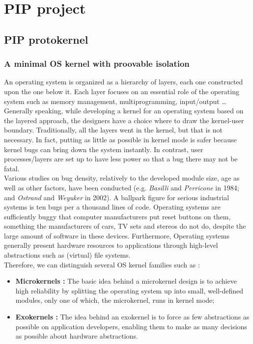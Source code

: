 \chapter{PIP project}

\section{PIP protokernel}

\subsection{A minimal OS kernel with proovable isolation} \label{PIP}
An operating system is organized as a hierarchy  of layers, each one constructed  upon  the one  below  it. Each layer focuses on an essential role of the operating system such as memory management, multiprogramming, input/output \dots Generally speaking, while developing a kernel for an operating system based on the layered  approach,  the designers have a choice where to draw the kernel-user boundary. Traditionally, all the layers went in the kernel, but that is not necessary. In fact, putting as little as possible in kernel mode is safer because kernel bugs can bring down the system instantly. In contrast, user processes/layers are set up to have less power so that a bug there may not be fatal.\\

Various studies on bug density, relatively to the developed module size, age as well as other factors, have been conducted (e.g.  \textit{Basilli}  and  \textit{Perricone} in 1984;  and \textit{Ostrand}  and  \textit{Weyuker} in 2002). A  ballpark  figure  for  serious industrial systems is ten  bugs per a thousand  lines  of code. Operating  systems  are  sufficiently  buggy  that  computer  manufacturers  put  reset  buttons  on  them, something  the  manufacturers of cars, TV sets and stereos do  not do,  despite  the  large  amount  of software in these devices. Furthermore, Operating systems generally present hardware resources to applications through high-level abstractions such as (virtual) file systems.\\

\noindent Therefore, we can distinguish several OS kernel families such as : 
\begin{itemize}
	\item \textbf{Microkernels :} The basic idea  behind a microkernel design  is  to  achieve  high reliability  by  splitting  the  operating  system  up  into  small,  well-defined  modules,  only  one  of  which, the  microkernel, runs  in  kernel  mode;
	\item \textbf{Exokernels :} The idea behind an exokernel is to force as few abstractions as possible on application developers, enabling them to make as many decisions as possible about hardware abstractions.
\end{itemize} 
  
